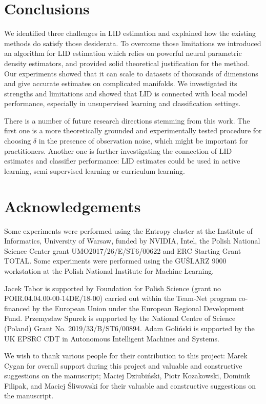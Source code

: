 \section{Conclusions}
\label{sec:conclusions}

We identified three challenges in LID estimation and explained how the existing methods do satisfy those desiderata. 
To overcome those limitations we introduced an algorithm for LID estimation which relies on powerful neural parametric density estimators, and provided solid theoretical justification for the method. 
Our experiments showed that it can scale to datasets of thousands of dimensions and give accurate estimates on complicated manifolds. 
We investigated its strengths and limitations and showed that LID is connected with local model performance, 
especially in unsupervised learning and classification settings.


There is a number of future research directions stemming from this work. 
The first one is a more theoretically grounded and experimentally tested procedure for choosing $\delta$ in the presence of observation noise, which might be important for practitioners. 
Another one is further investigating the connection of LID estimates and classifier performance: LID estimates could be used in active learning, semi supervised learning or curriculum learning. 

\section{Acknowledgements}
Some experiments were performed using the Entropy cluster at the Institute of Informatics, University of Warsaw, funded by NVIDIA, Intel, the Polish National Science Center grant UMO2017/26/E/ST6/00622 and ERC Starting Grant TOTAL. 
Some experiments were performed using the GUŚLARZ 9000 workstation at the Polish National Institute for Machine Learning.

Jacek Tabor is supported by Foundation for Polish Science (grant no POIR.04.04.00-00-14DE/18-00) carried out within the Team-Net program co-financed by the European Union under the European Regional Development Fund.
Przemysław Spurek is supported by the National Centre of Science (Poland) Grant No. 2019/33/B/ST6/00894.
Adam Goliński is supported by the UK EPSRC CDT in Autonomous Intelligent Machines and Systems.

We wish to thank various people for their contribution to this project: Marek Cygan for overall support during this project and valuable and constructive suggestions on the manuscript; Maciej Dziubiński, Piotr Kozakowski, Dominik Filipak, and Maciej Śliwowski for their valuable and constructive suggestions on the manuscript.

